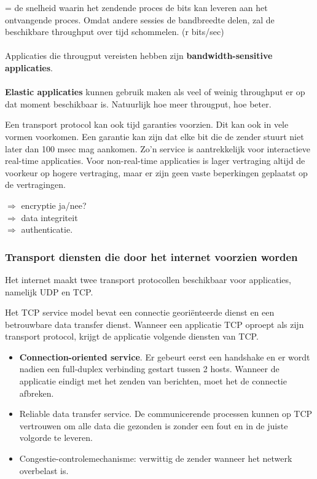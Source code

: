 = de snelheid waarin het zendende proces de bits kan leveren aan het ontvangende proces. Omdat andere sessies de bandbreedte delen, zal de beschikbare throughput over tijd schommelen. (r bits/sec)\\\\
Applicaties die througput vereisten hebben zijn \textbf{bandwidth-sensitive applicaties}. \\\\
\textbf{Elastic applicaties} kunnen gebruik maken als veel of weinig throughput er op dat moment beschikbaar is. Natuurlijk hoe meer througput, hoe beter.


Een transport protocol kan ook tijd garanties voorzien. Dit kan ook in vele vormen voorkomen. Een garantie kan zijn dat elke bit die de zender stuurt niet later dan 100 msec mag aankomen. Zo’n service is aantrekkelijk voor interactieve real-time applicaties. Voor non-real-time applicaties is lager vertraging altijd de voorkeur op hogere vertraging, maar er zijn geen vaste beperkingen geplaatst op de vertragingen.

$\Rightarrow$ encryptie ja/nee?\\
$\Rightarrow$ data integriteit\\
$\Rightarrow$ authenticatie.

\subsubsection{Transport diensten die door het internet voorzien worden}

Het internet maakt twee transport protocollen beschikbaar voor applicaties, namelijk UDP en TCP.


Het TCP service model bevat een connectie georiënteerde dienst en een betrouwbare data transfer dienst. Wanneer een applicatie TCP oproept als zijn transport protocol, krijgt de applicatie volgende diensten van TCP.
\begin{itemize}
    \item \textbf{Connection-oriented service}. 
    Er gebeurt eerst een handshake en er wordt nadien een full-duplex verbinding gestart tussen 2 hosts. Wanneer de applicatie eindigt met het zenden van berichten, moet het de connectie afbreken.
    \item Reliable data transfer service. De communicerende processen kunnen op TCP vertrouwen om alle data die gezonden is zonder een fout en in de juiste volgorde te leveren.
    \item Congestie-controlemechanisme: verwittig de zender wanneer het netwerk overbelast is.
\end{itemize}

